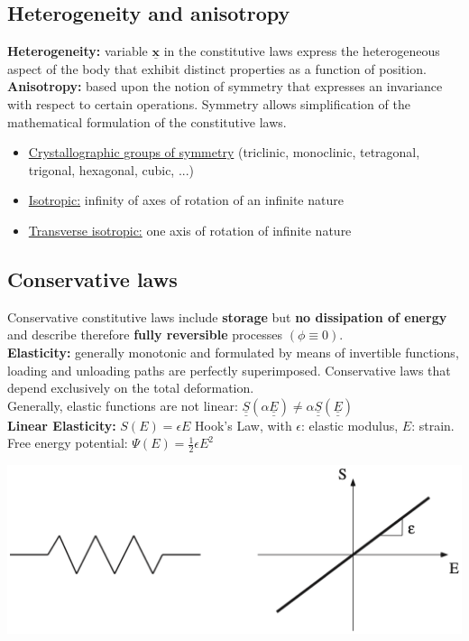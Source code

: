 \subsection*{Heterogeneity and anisotropy}
\textbf{Heterogeneity:} variable $\underline{\mathbf{x}}$ in the constitutive laws express the heterogeneous aspect of the body that exhibit distinct properties as a function of position. \\
\textbf{Anisotropy:} based upon the notion of symmetry that expresses an invariance with respect to certain operations. Symmetry allows simplification of the mathematical formulation of the constitutive laws.

\begin{itemize}
\item \underline{Crystallographic groups of symmetry} (triclinic, monoclinic, tetragonal, trigonal, hexagonal, cubic, ...)
\item \underline{Isotropic:} infinity of axes of rotation of an infinite nature
\item \underline{Transverse isotropic:} one axis of rotation of infinite nature
\end{itemize}

\subsection*{Conservative laws}
Conservative constitutive laws include \textbf{storage} but \textbf{no dissipation of energy} and describe therefore \textbf{fully reversible} processes $(\phi \equiv 0)$. \\
\textbf{Elasticity:} generally monotonic and formulated by means of invertible functions, loading and unloading paths are perfectly superimposed. Conservative laws that depend exclusively on the total deformation. \\
Generally, elastic functions are not linear:
$ \underline{\underline{S}} (\alpha \underline{\underline{E}}) \neq \alpha \underline{\underline{S}} (\underline{\underline{E}}) $ \\
\textbf{Linear Elasticity:} $S(E) = \epsilon E$ Hook's Law, with $\epsilon$: elastic modulus, $E$: strain. \\
Free energy potential: $\Psi(E)=\frac{1}{2}\epsilon E^2$

\begin{center}
\includegraphics[width=0.5\linewidth]{img/Lin} \\
\end{center}

